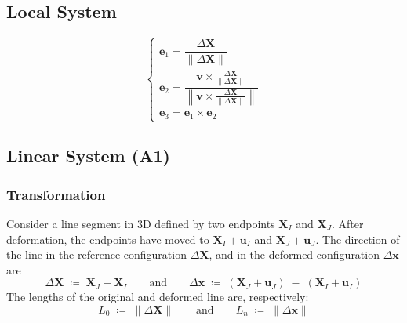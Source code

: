 \newcommand{\AlignAxis}{\bm{\alpha}}

\subsection{Local System}
\begin{equation}
\begin{cases}
\mathbf{e}_1=\dfrac{\Delta \bm{X}}{\|\Delta \bm{X}\|} \\
\mathbf{e}_2=\dfrac{\mathbf{v} \times \frac{\Delta \bm{X}}{\|\Delta \bm{X}\|}}{\left\|\mathbf{v} \times \frac{\Delta \bm{X}}{\|\Delta \bm{X}\|}\right\|} \\
\mathbf{e}_3 = \mathbf{e}_1 \times \mathbf{e}_2
\end{cases}
\end{equation}


\subsection{Linear System (A1)}

\subsubsection{Transformation}

Consider a line segment in 3D defined by two endpoints \(\bm{X}_I\) and \(\bm{X}_J\). 
After deformation, the endpoints have moved to \(\bm{X}_I + \bm{u}_I\)
 and \(\bm{X}_J + \bm{u}_J\). 
The direction of the line in the reference configuration $\Delta\bm{X}$, and in the deformed configuration $\Delta \bm{x}$ are
\begin{equation}
\Delta \bm{X} \;\coloneq\; \bm{X}_J - \bm{X}_I
\qquad\text{and}\qquad
\Delta \bm{x} \;\coloneq\; (\bm{X}_J + \bm{u}_J)\;-\;(\bm{X}_I + \bm{u}_I)
\end{equation}
The lengths of the original and deformed line are, respectively:
\[
L_0 \; \coloneq \; \|\Delta \bm{X}\|
\qquad\text{and}\qquad
L_n \; \coloneq \; \|\Delta \bm{x}\|
\]

